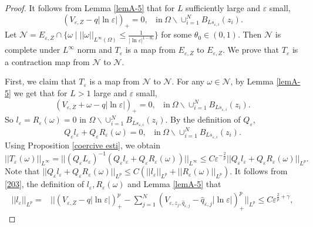 \documentclass[12pt,reqno]{amsart}
\numberwithin{equation}{section}
\theoremstyle{definition}
\theoremstyle{remark}
\begin{document}
\begin{proof}
It follows from  Lemma \ref{lemA-5} that for $ L $ sufficiently large and $ \varepsilon $ small,
\begin{equation*}
\left (V_{\varepsilon,Z}-q|\ln\varepsilon|\right )_+=0,\ \ \ \ \text{in}\ \Omega \backslash\cup_{i=1}^NB_{Ls_{\varepsilon,i}}(z_{i}).
\end{equation*}
Let $ \mathcal{N}= E_{\varepsilon,Z} \cap\{\omega\mid ||\omega||_{L^\infty(\Omega)}\leq \frac{1}{|\ln\varepsilon|^{1-\theta_0}}\}$ for some $ \theta_0\in(0,1). $ Then $ \mathcal{N} $ is complete under $ L^\infty $ norm and $ T_\varepsilon $ is a map from $ E_{\varepsilon,Z} $ to $ E_{\varepsilon,Z} $. We prove that $ T_\varepsilon $ is a contraction map from $ \mathcal{N} $ to $ \mathcal{N} $.

First, we claim that $ T_\varepsilon $ is a map from $ \mathcal{N} $ to $ \mathcal{N} $. For any $ \omega\in \mathcal{N} $, by Lemma \ref{lemA-5} we get that for $ L>1 $ large and  $ \varepsilon $ small,
\begin{equation*}
\left (V_{\varepsilon,Z}+\omega-q|\ln\varepsilon|\right )_+=0,\ \ \ \ \text{in}\ \Omega \backslash\cup_{i=1}^NB_{Ls_{\varepsilon,i}}(z_{i}).
\end{equation*}
So $ l_\varepsilon=R_\varepsilon(\omega)=0 $ in $ \Omega \backslash\cup_{i=1}^NB_{Ls_{\varepsilon,i}}(z_{i}). $ By the definition of $ Q_\varepsilon $,
\begin{equation*}
Q_\varepsilon l_\varepsilon+Q_\varepsilon R_\varepsilon(\omega)=0,\ \ \ \ \text{in}\ \Omega \backslash\cup_{i=1}^NB_{Ls_{\varepsilon,i}}(z_{i}).
\end{equation*}
Using Proposition \ref{coercive esti}, we obtain
\begin{equation*}
||T_\varepsilon(\omega)||_{L^\infty}=||(Q_\varepsilon L_\varepsilon)^{-1}(Q_\varepsilon l_\varepsilon+Q_\varepsilon R_\varepsilon(\omega))||_{L^\infty}\leq C\varepsilon^{-\frac{2}{p}}||Q_\varepsilon l_\varepsilon+Q_\varepsilon R_\varepsilon(\omega)||_{L^p}.
\end{equation*}
Note that $ ||Q_\varepsilon l_\varepsilon+Q_\varepsilon R_\varepsilon(\omega)||_{L^p}\leq C(|| l_\varepsilon||_{L^p}+ ||R_\varepsilon(\omega)||_{L^p}). $
It follows from \eqref{203}, the definition of $ l_\varepsilon, R_\varepsilon(\omega) $ and Lemma \ref{lemA-5} that
\begin{equation*}
\begin{split}
||l_\varepsilon||_{L^p}=&||\left (V_{\varepsilon,Z}-q|\ln\varepsilon|\right )^p_+-\sum_{j=1}^N\left (V_{\varepsilon,z_j,\hat{q}_{\varepsilon,j}}-\hat{q}_{\varepsilon,j}|\ln\varepsilon|\right )^p_+||_{L^p}\leq C\varepsilon^{\frac{2}{p}+\gamma},

\end{split}
\end{equation*}
\end{proof}
\end{document}
